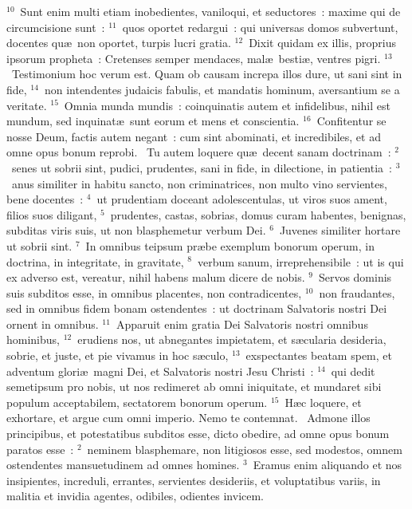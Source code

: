 ${}^{10}$~Sunt enim multi etiam inobedientes, vaniloqui, et seductores~: maxime qui de circumcisione sunt~:
${}^{11}$~quos oportet redargui~: qui universas domos subvertunt, docentes qu\ae\ non oportet, turpis lucri gratia.
${}^{12}$~Dixit quidam ex illis, proprius ipsorum propheta~: Cretenses semper mendaces, mal\ae\ besti\ae , ventres pigri.
${}^{13}$~Testimonium hoc verum est. Quam ob causam increpa illos dure, ut sani sint in fide,
${}^{14}$~non intendentes judaicis fabulis, et mandatis hominum, aversantium se a veritate.
${}^{15}$~Omnia munda mundis~: coinquinatis autem et infidelibus, nihil est mundum, sed inquinat\ae\ sunt eorum et mens et conscientia.
${}^{16}$~Confitentur se nosse Deum, factis autem negant~: cum sint abominati, et incredibiles, et ad omne opus bonum reprobi.
~Tu autem loquere qu\ae\ decent sanam doctrinam~:
${}^{2}$~senes ut sobrii sint, pudici, prudentes, sani in fide, in dilectione, in patientia~:
${}^{3}$~anus similiter in habitu sancto, non criminatrices, non multo vino servientes, bene docentes~:
${}^{4}$~ut prudentiam doceant adolescentulas, ut viros suos ament, filios suos diligant,
${}^{5}$~prudentes, castas, sobrias, domus curam habentes, benignas, subditas viris suis, ut non blasphemetur verbum Dei.
${}^{6}$~Juvenes similiter hortare ut sobrii sint.
${}^{7}$~In omnibus teipsum pr\ae be exemplum bonorum operum, in doctrina, in integritate, in gravitate,
${}^{8}$~verbum sanum, irreprehensibile~: ut is qui ex adverso est, vereatur, nihil habens malum dicere de nobis.
${}^{9}$~Servos dominis suis subditos esse, in omnibus placentes, non contradicentes,
${}^{10}$~non fraudantes, sed in omnibus fidem bonam ostendentes~: ut doctrinam Salvatoris nostri Dei ornent in omnibus.
${}^{11}$~Apparuit enim gratia Dei Salvatoris nostri omnibus hominibus,
${}^{12}$~erudiens nos, ut abnegantes impietatem, et s\ae cularia desideria, sobrie, et juste, et pie vivamus in hoc s\ae culo,
${}^{13}$~exspectantes beatam spem, et adventum glori\ae\ magni Dei, et Salvatoris nostri Jesu Christi~:
${}^{14}$~qui dedit semetipsum pro nobis, ut nos redimeret ab omni iniquitate, et mundaret sibi populum acceptabilem, sectatorem bonorum operum.
${}^{15}$~H\ae c loquere, et exhortare, et argue cum omni imperio. Nemo te contemnat.
~Admone illos principibus, et potestatibus subditos esse, dicto obedire, ad omne opus bonum paratos esse~:
${}^{2}$~neminem blasphemare, non litigiosos esse, sed modestos, omnem ostendentes mansuetudinem ad omnes homines.
${}^{3}$~Eramus enim aliquando et nos insipientes, increduli, errantes, servientes desideriis, et voluptatibus variis, in malitia et invidia agentes, odibiles, odientes invicem.
